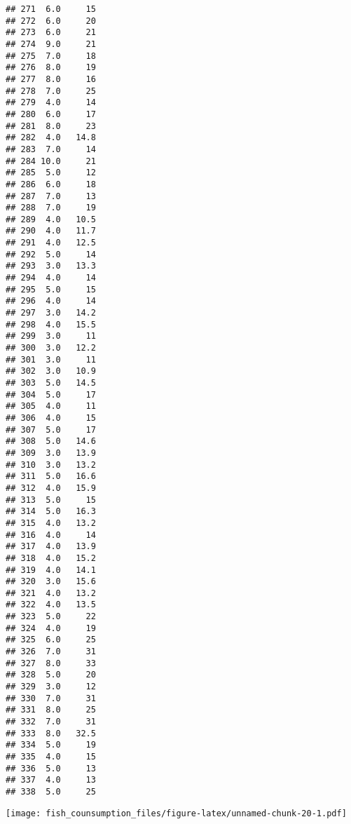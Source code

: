 \documentclass[
]{article}
\newenvironment{Shaded}{\begin{snugshade}}{\end{snugshade}}
\newcommand{\AttributeTok}[1]{\textcolor[rgb]{0.13,0.29,0.53}{#1}}
\newcommand{\CommentTok}[1]{\textcolor[rgb]{0.56,0.35,0.01}{\textit{#1}}}
\newcommand{\FunctionTok}[1]{\textcolor[rgb]{0.13,0.29,0.53}{\textbf{#1}}}
\newcommand{\NormalTok}[1]{#1}
\newcommand{\OtherTok}[1]{\textcolor[rgb]{0.56,0.35,0.01}{#1}}
\newcommand{\SpecialCharTok}[1]{\textcolor[rgb]{0.81,0.36,0.00}{\textbf{#1}}}
\newcommand{\StringTok}[1]{\textcolor[rgb]{0.31,0.60,0.02}{#1}}
\begin{document}
\begin{verbatim}
## 271  6.0     15
## 272  6.0     20
## 273  6.0     21
## 274  9.0     21
## 275  7.0     18
## 276  8.0     19
## 277  8.0     16
## 278  7.0     25
## 279  4.0     14
## 280  6.0     17
## 281  8.0     23
## 282  4.0   14.8
## 283  7.0     14
## 284 10.0     21
## 285  5.0     12
## 286  6.0     18
## 287  7.0     13
## 288  7.0     19
## 289  4.0   10.5
## 290  4.0   11.7
## 291  4.0   12.5
## 292  5.0     14
## 293  3.0   13.3
## 294  4.0     14
## 295  5.0     15
## 296  4.0     14
## 297  3.0   14.2
## 298  4.0   15.5
## 299  3.0     11
## 300  3.0   12.2
## 301  3.0     11
## 302  3.0   10.9
## 303  5.0   14.5
## 304  5.0     17
## 305  4.0     11
## 306  4.0     15
## 307  5.0     17
## 308  5.0   14.6
## 309  3.0   13.9
## 310  3.0   13.2
## 311  5.0   16.6
## 312  4.0   15.9
## 313  5.0     15
## 314  5.0   16.3
## 315  4.0   13.2
## 316  4.0     14
## 317  4.0   13.9
## 318  4.0   15.2
## 319  4.0   14.1
## 320  3.0   15.6
## 321  4.0   13.2
## 322  4.0   13.5
## 323  5.0     22
## 324  4.0     19
## 325  6.0     25
## 326  7.0     31
## 327  8.0     33
## 328  5.0     20
## 329  3.0     12
## 330  7.0     31
## 331  8.0     25
## 332  7.0     31
## 333  8.0   32.5
## 334  5.0     19
## 335  4.0     15
## 336  5.0     13
## 337  4.0     13
## 338  5.0     25
\end{verbatim}

\begin{Shaded}
\end{Shaded}

\texttt{[image: fish\_counsumption\_files/figure-latex/unnamed-chunk-20-1.pdf]}
\end{document}
